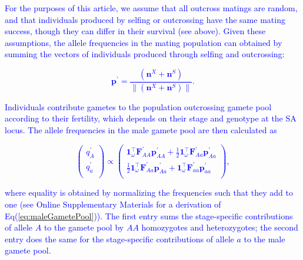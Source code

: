 \documentclass[11pt]{article}
\def\mbf#1{\mathbf{#1}}
\begin{document}
 \textcolor{blue}{ For the purposes of this article, we assume that all outcross matings are random, and that individuals produced by selfing or outcrossing have the same mating success, though they can differ in their survival (see above). Given these assumptions, the allele frequencies in the mating population can obtained by summing the vectors of individuals produced through selfing and outcrossing:
\begin{linenomath*}
\begin{equation}
 	\mbf{p}^{\prime}=\frac{(\mbf{n}^X + \mbf{n}^S)}{\| (\mbf{n}^X + \mbf{n}^S)\|}.
 \end{equation}
\end{linenomath*}}
\textcolor{blue}{Individuals contribute gametes to the population outcrossing gamete pool according to their fertility, which depends on their stage and genotype at the SA locus. The allele frequencies in the male gamete pool are then calculated as 
\begin{linenomath*}
\begin{equation} \label{eq:maleGametePool}
	\left(
		\begin{array}{c}
			q^{\prime}_{A} \\
			q^{\prime}_{a} \\
		\end{array} \right) \propto 
				\left(
		\begin{array}{c}
			\mbf{1}^{\intercal}_{\omega}\mbf{F}^{\prime}_{AA}\mbf{p}^{\prime}_{AA}+ \frac{1}{2} \mbf{1}^{\intercal}_{\omega}  \mbf{F}^{\prime}_{Aa} \mbf{p}^{\prime}_{Aa}  \\
		\frac{1}{2} \mbf{1}^{\intercal}_{\omega}  \mbf{F}^{\prime}_{Aa} \mbf{p}^{\prime}_{Aa} + \mbf{1}^{\intercal}_{\omega}\mbf{F}^{\prime}_{aa}\mbf{p}^{\prime}_{aa}\\
		\end{array} \right),
\end{equation}
\end{linenomath*}
where equality is obtained by normalizing the frequencies such that they add to one (see Online Supplementary Materials for a derivation of Eq(\ref{eq:maleGametePool})). The first entry sums the  stage-specific contributions of allele $A$ to the gamete pool by $AA$ homozygotes and heterozygotes; the second entry does the same for the stage-specific contributions of allele $a$ to the male gamete pool. }
\end{document}
